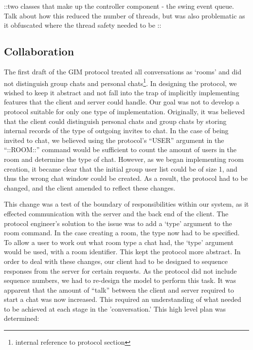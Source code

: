 ::two classes that make up the controller component - the swing event queue. Talk about how this reduced the number of threads, but was also problematic as it obfuscated where the thread safety needed to be ::


\subsection{Collaboration}

The first draft of the GIM protocol treated all conversations as `rooms' and did not distinguish group chats and personal chats\footnote{internal reference to protocol section}. In designing the protocol, we wished to keep it abstract and not fall into the trap of implicitly implementing features that the client and server could handle. Our goal was not to develop a protocol suitable for only one type of implementation. Originally, it was believed that the client could distinguish personal chats and group chats by storing internal records of the type of outgoing invites to chat. In the case of being invited to chat, we believed using the protocol's ``USER'' argument in the ``::ROOM::'' command would be sufficient to count the amount of users in the room and determine the type of chat. However, as we began implementing room creation, it became clear that the initial group user list could be of size 1, and thus the wrong chat window could be created. As a result, the protocol had to be changed, and the client amended to reflect these changes. 

This change was a test of the boundary of responsibilities within our system, as it effected communication with the server and the back end of the client. The protocol engineer's solution to the issue was to add a `type' argument to the room command. In the case creating a room, the type now had to be specified. To allow a user to work out what room type a chat had, the `type' argument would be used, with a room identifier. This kept the protocol more abstract. In order to deal with these changes, our client had to be designed to sequence responses from the server for certain requests. As the protocol did not include sequence numbers, we had to re-design the model to perform this task. It was apparent that the amount of ``talk'' between the client and server required to start a chat was now increased. This required an understanding of what needed to be achieved at each stage in the 'conversation.' This high level plan was determined:

